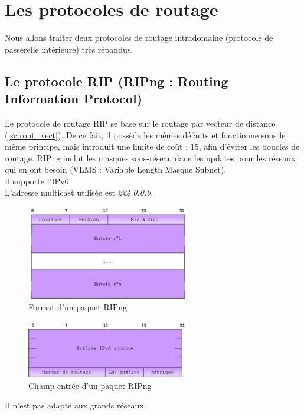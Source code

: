   \section{Les protocoles de routage}
Nous allons traiter deux protocoles de routage intradomaine (protocole de passerelle intérieure) très répandus. 

  \subsection{Le protocole RIP (RIPng : Routing Information Protocol)}\label{sc:ripng}
Le protocole de routage RIP se base sur le routage par vecteur de distance (\ref{sc:rout_vect}). De ce fait, il possède les mêmes défauts et fonctionne sous le même principe, mais introduit une limite de coût : 15, afin d’éviter les boucles de routage. RIPng inclut les masques sous-réseau dans les updates pour les réseaux qui en ont besoin (VLMS : Variable Length Masque Subnet).
\\
Il supporte l’IPv6.
\\
L’adresse multicast utilisée est \textit{224.0.0.9}.

    \begin{figure}[h]
    \includegraphics[width=270px]{figures/RIPvng_paquet.png}
    \centering
    \caption{Format d'un paquet RIPng \cite{Xripng}}
    \end{figure}

    \begin{figure}[H]
    \includegraphics[width=270px]{figures/RIPvng_entree.png}
    \centering
    \caption{Champ entrée d'un paquet RIPng \cite{Xripng}}
    \end{figure}

Il n’est pas adapté aux grands réseaux.

